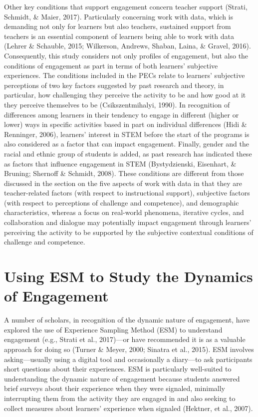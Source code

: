 \documentclass[]{msu-thesis}
\theoremstyle{definition}
\theoremstyle{definition}
\theoremstyle{definition}
\theoremstyle{remark}
\begin{document}
Other key conditions that support engagement concern teacher support
(Strati, Schmidt, \& Maier, 2017). Particularly concerning work with
data, which is demanding not only for learners but also teachers,
sustained support from teachers is an essential component of learners
being able to work with data (Lehrer \& Schauble, 2015; Wilkerson,
Andrews, Shaban, Laina, \& Gravel, 2016). Consequently, this study
considers not only profiles of engagement, but also the conditions of
engagement as part in terms of both learners' subjective experiences.
The conditions included in the PECs relate to learners' subjective
perceptions of two key factors suggested by past research and theory, in
particular, how challenging they perceive the activity to be and how
good at it they perceive themselves to be (Csikszentmihalyi, 1990). In
recognition of differences among learners in their tendency to engage in
different (higher or lower) ways in specific activities based in part on
individual differences (Hidi \& Renninger, 2006), learners' interest in
STEM before the start of the programs is also considered as a factor
that can impact engagement. Finally, gender and the racial and ethnic
group of students is added, as past research has indicated these as
factors that influence engagement in STEM (Bystydzienski, Eisenhart, \&
Bruning; Shernoff \& Schmidt, 2008). These conditions are different from
those discussed in the section on the five aspects of work with data in
that they are teacher-related factors (with respect to instructional
support), subjective factors (with respect to perceptions of challenge
and competence), and demographic characteristics, whereas a focus on
real-world phenomena, iterative cycles, and collaboration and dialogue
may potentially impact engagement through learners' perceiving the
activity to be supported by the subjective contextual conditions of
challenge and competence.

\section{Using ESM to Study the Dynamics of
Engagement}\label{using-esm-to-study-the-dynamics-of-engagement}

A number of scholars, in recognition of the dynamic nature of
engagement, have explored the use of Experience Sampling Method (ESM) to
understand engagement (e.g., Strati et al., 2017)---or have recommended
it is as a valuable approach for doing so (Turner \& Meyer, 2000;
Sinatra et al., 2015). ESM involves asking---usually using a digital
tool and occasionally a diary---to ask participants short questions
about their experiences. ESM is particularly well-suited to
understanding the dynamic nature of engagement because students answered
brief surveys about their experience when they were signaled, minimally
interrupting them from the activity they are engaged in and also seeking
to collect measures about learners' experience when signaled (Hektner,
et al., 2007).
\end{document}
